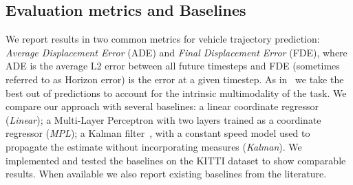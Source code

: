 \documentclass[10pt,twocolumn,letterpaper]{article}
\begin{document}
\subsection{Evaluation metrics and Baselines}
We report results in two common metrics for vehicle trajectory prediction: \textit{Average Displacement Error} (ADE) and \textit{Final Displacement Error} (FDE), where ADE is the average L2 error between all future timesteps and FDE (sometimes referred to as Horizon error) is the error at a given timestep. As in~\cite{lee2017desire, srikanth2019infer} we take the best out of  predictions to account for the intrinsic multimodality of the task.
We compare our approach with several baselines: a linear coordinate regressor (\textit{Linear}); a Multi-Layer Perceptron with two layers trained as a coordinate regressor (\textit{MPL}); a Kalman filter~\cite{kalman1960new}, with a constant speed model used to propagate the estimate without incorporating measures (\textit{Kalman}).
We implemented and tested the baselines on the KITTI dataset to show comparable results. When available we also report existing baselines from the literature.
\end{document}
